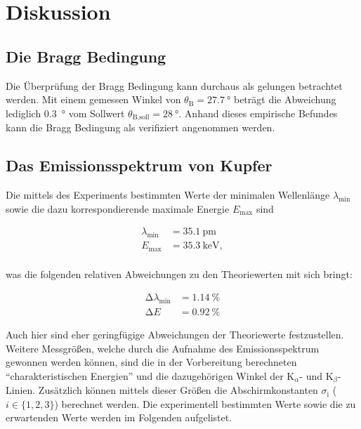 %

%
\section{Diskussion}
\label{sec:Diskussion}

\subsection{Die Bragg Bedingung}

Die Überprüfung der Bragg Bedingung kann durchaus als gelungen betrachtet werden. Mit einem gemessen Winkel von $\theta_\text{B} = \qty{27.7}{\degree}$
beträgt die Abweichung lediglich \qty{0.3}{\degree} vom Sollwert $\theta_\text{B,soll} = \qty{28}{\degree}$. Anhand dieses empirische Befundes kann 
die Bragg Bedingung als verifiziert angenommen werden. 

\subsection{Das Emissionsspektrum von Kupfer}

Die mittels des Experiments bestimmten Werte der minimalen Wellenlänge $\lambda_\text{min}$ sowie die dazu korrespondierende maximale Energie $E_\text{max}$
sind 

\begin{align*}
    \lambda_\text{min} &= \qty{35.1}{\pico\meter} \\
    E_\text{max} &= \qty{35.3}{\kilo\electronvolt}, \\
\end{align*}

\noindent was die folgenden relativen Abweichungen zu den Theoriewerten mit sich bringt:

\begin{align*}
    \increment\lambda_\text{min} &= \qty{1.14}{\percent}\\
    \increment{}E &= \qty{0.92}{\percent}
\end{align*}

\noindent Auch hier sind eher geringfügige Abweichungen der Theoriewerte festzustellen.\\

\noindent Weitere Messgrößen, welche durch die Aufnahme des Emissionsspektrum gewonnen werden können, sind die in der Vorbereitung berechneten 
\enquote{charakteristischen Energien} und die dazugehörigen Winkel der $\text{K}_\alpha$- und $\text{K}_\beta$-Linien. Zusätzlich können mittels 
dieser Größen die Abschirmkonstanten $\sigma_\text{i}$ ($i \in \{1,2,3\}$) berechnet werden. Die experimentell bestimmten Werte sowie die zu erwartenden 
Werte werden im Folgenden aufgelistet. 

